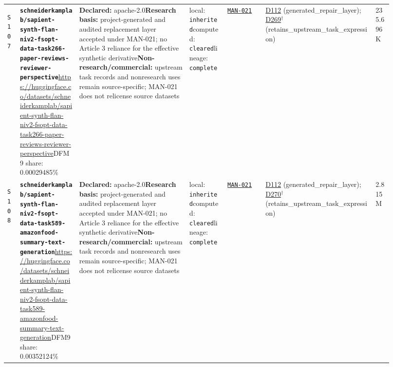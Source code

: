 \documentclass[9pt,a4paper]{article}
\newcommand{\srcid}[1]{\hypertarget{src:#1}{\texttt{#1}}}
\begin{document}
\begin{landscape}
\begin{longtable}{@{}L{0.03\linewidth}L{0.14\linewidth}L{0.26\linewidth}L{0.09\linewidth}L{0.09\linewidth}L{0.265\linewidth}L{0.045\linewidth}@{}}
\srcid{S107} & \textbf{\nolinkurl{schneiderkamplab/sapient-synth-flan-niv2-fsopt-data-task266-paper-reviews-reviewer-perspective}}\newline \url{https://huggingface.co/datasets/schneiderkamplab/sapient-synth-flan-niv2-fsopt-data-task266-paper-reviews-reviewer-perspective}\newline DFM9 share: 0.00029485\% & \textbf{Declared:} apache-2.0\newline \textbf{Research basis:} project-generated and audited replacement layer accepted under MAN-021; no Article 3 reliance for the effective synthetic derivative\newline \textbf{Non-research/commercial:} upstream task records and nonresearch uses remain source-specific; MAN-021 does not relicense source datasets & local: \texttt{inherited}\newline computed: \texttt{cleared}\newline lineage: \texttt{complete} & \hyperlink{manual:MAN-021}{\texttt{MAN-021}} & \hyperlink{dep:D112}{D112} (generated\_repair\_layer); \hyperlink{dep:D269}{D269}$^{\dagger}$ (retains\_upstream\_task\_expression) & 235.696K \\
\srcid{S108} & \textbf{\nolinkurl{schneiderkamplab/sapient-synth-flan-niv2-fsopt-data-task589-amazonfood-summary-text-generation}}\newline \url{https://huggingface.co/datasets/schneiderkamplab/sapient-synth-flan-niv2-fsopt-data-task589-amazonfood-summary-text-generation}\newline DFM9 share: 0.00352124\% & \textbf{Declared:} apache-2.0\newline \textbf{Research basis:} project-generated and audited replacement layer accepted under MAN-021; no Article 3 reliance for the effective synthetic derivative\newline \textbf{Non-research/commercial:} upstream task records and nonresearch uses remain source-specific; MAN-021 does not relicense source datasets & local: \texttt{inherited}\newline computed: \texttt{cleared}\newline lineage: \texttt{complete} & \hyperlink{manual:MAN-021}{\texttt{MAN-021}} & \hyperlink{dep:D112}{D112} (generated\_repair\_layer); \hyperlink{dep:D270}{D270}$^{\dagger}$ (retains\_upstream\_task\_expression) & 2.815M \\

\end{longtable}
\end{landscape}
\end{document}
